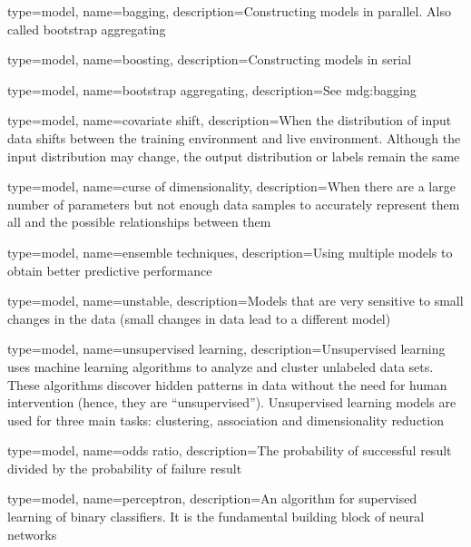 

{
	type=model,
    name=bagging,
    description={Constructing models in parallel.  Also called bootstrap aggregating}
}

{
	type=model,
    name=boosting,
    description={Constructing models in serial}
}

{
	type=model,
    name=bootstrap aggregating,
    description={See \gls{mdg:bagging}}
}

{
	type=model,
    name=covariate shift,
    description={When the distribution of input data shifts between the training environment and live environment.  Although the input distribution may change, the output distribution or labels remain the same}
}

{
	type=model,
    name=curse of dimensionality,
    description={When there are a large number of parameters but not enough data samples to accurately represent them all and the possible relationships between them}
}

{
	type=model,
    name=ensemble techniques,
    description={Using multiple models to obtain better predictive performance}
}

{
	type=model,
    name=unstable,
    description={Models that are very sensitive to small changes in the data (small changes in data lead to a different model)}
}

{
	type=model,
    name=unsupervised learning,
    description={Unsupervised learning uses machine learning algorithms to analyze and cluster unlabeled data sets. These algorithms discover hidden patterns in data without the need for human intervention (hence, they are ``unsupervised'').  Unsupervised learning models are used for three main tasks: clustering, association and dimensionality reduction}
}

{
	type=model,
    name=odds ratio,
    description={The probability of successful result divided by the probability of failure result}
}

{
	type=model,
    name=perceptron,
    description={An algorithm for supervised learning of binary classifiers.  It is the fundamental building block of neural networks}
}

